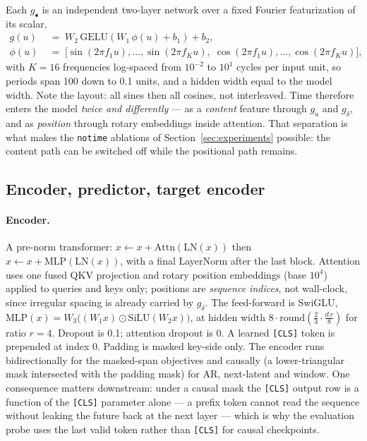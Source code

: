 \documentclass[11pt,a4paper]{article}
\newcommand{\code}[1]{\texttt{\small #1}}
\begin{document}
Each $g_\bullet$ is an independent two-layer network over a fixed Fourier
featurization of its scalar,
\begin{equation}
\begin{aligned}
g(u) &\;=\; W_2\,\mathrm{GELU}\!\left(W_1\,\phi(u) + b_1\right) + b_2, \\[2pt]
\phi(u) &\;=\; \big[\sin(2\pi f_1 u), \ldots, \sin(2\pi f_K u),\;
               \cos(2\pi f_1 u), \ldots, \cos(2\pi f_K u)\big],
\end{aligned}
\end{equation}
with $K = 16$ frequencies log-spaced from $10^{-2}$ to $10^{1}$ cycles per input
unit, so periods span 100 down to 0.1 units, and a hidden width equal to the
model width. Note the layout: all sines then all cosines, not interleaved. Time
therefore enters the model \emph{twice and differently} --- as a \emph{content}
feature through $g_a$ and $g_\delta$, and as \emph{position} through rotary
embeddings inside attention. That separation is what makes the \code{notime}
ablations of Section~\ref{sec:experiments} possible: the content path can be
switched off while the positional path remains.

\subsection{Encoder, predictor, target encoder}

\paragraph{Encoder.}
A pre-norm transformer: $x \leftarrow x + \mathrm{Attn}(\mathrm{LN}(x))$ then
$x \leftarrow x + \mathrm{MLP}(\mathrm{LN}(x))$, with a final LayerNorm after
the last block. Attention uses one fused QKV projection and rotary position
embeddings (base $10^4$) applied to queries and keys only; positions are
\emph{sequence indices}, not wall-clock, since irregular spacing is already
carried by $g_\delta$. The feed-forward is SwiGLU,
$\mathrm{MLP}(x) = W_3\big((W_1 x)\odot\mathrm{SiLU}(W_2 x)\big)$, at hidden
width $8\cdot\mathrm{round}(\tfrac{2}{3}\cdot\tfrac{d\,r}{8})$ for ratio
$r = 4$. Dropout is 0.1; attention dropout is 0. A learned \code{[CLS]} token is
prepended at index 0. Padding is masked key-side only. The encoder runs
bidirectionally for the masked-span objectives and causally (a lower-triangular
mask intersected with the padding mask) for AR, next-latent and window. One
consequence matters downstream: under a causal mask the \code{[CLS]} output row
is a function of the \code{[CLS]} parameter alone --- a prefix token cannot read
the sequence without leaking the future back at the next layer --- which is why
the evaluation probe uses the last valid token rather than \code{[CLS]} for
causal checkpoints.
\end{document}
